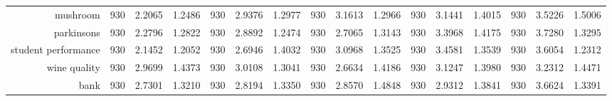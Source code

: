 \begin{table}[H]
{\begin{tabular}{rccccccccccccccc}
			mushroom                            & 930                                  & \cellcolor[rgb]{ .776,  .937,  .808}\textcolor[rgb]{ 0,  .38,  0}{2.2065}          & 1.2486          & 930            & 2.9376                                                                    & 1.2977          & 930            & 3.1613                                                                    & 1.2966          & 930            & 3.1441                                                                    & 1.4015          & 930            & 3.5226          & 1.5006          \\
			parkinsons                          & 930                                  & \cellcolor[rgb]{ .776,  .937,  .808}\textcolor[rgb]{ 0,  .38,  0}{2.2796}          & 1.2822          & 930            & 2.8892                                                                    & 1.2474          & 930            & 2.7065                                                                    & 1.3143          & 930            & 3.3968                                                                    & 1.4175          & 930            & 3.7280          & 1.3295          \\
			student performance                 & 930                                  & \cellcolor[rgb]{ .776,  .937,  .808}\textcolor[rgb]{ 0,  .38,  0}{2.1452}          & 1.2052          & 930            & 2.6946                                                                    & 1.4032          & 930            & 3.0968                                                                    & 1.3525          & 930            & 3.4581                                                                    & 1.3539          & 930            & 3.6054          & 1.2312          \\
			wine quality                        & 930                                  & 2.9699                                                                             & 1.4373          & 930            & 3.0108                                                                    & 1.3041          & 930            & \cellcolor[rgb]{ .776,  .937,  .808}\textcolor[rgb]{ 0,  .38,  0}{2.6634} & 1.4186          & 930            & 3.1247                                                                    & 1.3980          & 930            & 3.2312          & 1.4471          \\
			bank                                & 930                                  & 2.7301                                                                             & 1.3210          & 930            & 2.8194                                                                    & 1.3350          & 930            & 2.8570                                                                    & 1.4848          & 930            & 2.9312                                                                    & 1.3841          & 930            & 3.6624          & 1.3391          \\

\end{tabular}}
\end{table}
